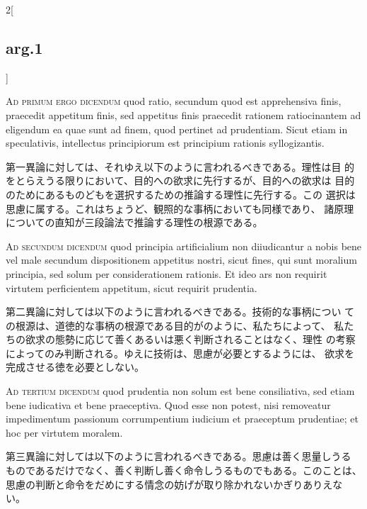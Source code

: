 \documentclass[paper=a4paper,fontsize=10pt,jafontsize=9pt,titlepage]{jlreq}
\begin{document}
\begin{paracol}{2}[\subsection{arg.1}]
\switchcolumn*[\subsection{ad.1}]

{\scshape Ad primum ergo dicendum} quod ratio, secundum quod est
apprehensiva finis, praecedit appetitum finis, sed appetitus finis
praecedit rationem ratiocinantem ad eligendum ea quae sunt ad finem,
quod pertinet ad prudentiam. Sicut etiam in speculativis, intellectus
principiorum est principium rationis syllogizantis.

\switchcolumn

第一異論に対しては、それゆえ以下のように言われるべきである。理性は目
 的をとらえうる限りにおいて、目的への欲求に先行するが、目的への欲求は
 目的のためにあるものどもを選択するための推論する理性に先行する。この
 選択は思慮に属する。これはちょうど、観照的な事柄においても同様であり、
 諸原理についての直知が三段論法で推論する理性の根源である。

\switchcolumn*[\subsection{ad.2}]

{\scshape Ad secundum dicendum} quod principia artificialium non
diiudicantur a nobis bene vel male secundum dispositionem appetitus
nostri, sicut fines, qui sunt moralium principia, sed solum per
considerationem rationis. Et ideo ars non requirit virtutem
perficientem appetitum, sicut requirit prudentia.

\switchcolumn

第二異論に対しては以下のように言われるべきである。技術的な事柄につい
 ての根源は、道徳的な事柄の根源である目的がのように、私たちによって、
 私たちの欲求の態勢に応じて善くあるいは悪く判断されることはなく、理性
 の考察によってのみ判断される。ゆえに技術は、思慮が必要とするようには、
 欲求を完成させる徳を必要としない。

\switchcolumn*[\subsection{ad.3}]

{\scshape Ad tertium dicendum} quod prudentia non solum est bene
consiliativa, sed etiam bene iudicativa et bene praeceptiva. Quod esse
non potest, nisi removeatur impedimentum passionum corrumpentium
iudicium et praeceptum prudentiae; et hoc per virtutem moralem.

\switchcolumn

第三異論に対しては以下のように言われるべきである。思慮は善く思量しうる
ものであるだけでなく、善く判断し善く命令しうるものでもある。このことは、
思慮の判断と命令をだめにする情念の妨げが取り除かれないかぎりありえない。

\end{paracol}
\end{document}
